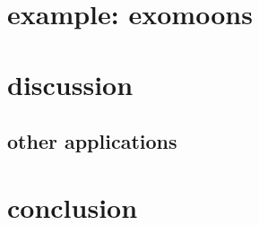 \documentclass[modern]{aastex62}
\begin{document}
	
\section{example: exomoons}

\section{discussion}
	\subsection{other applications}

\section{conclusion}

\acknowledgments

%





\end{document}

